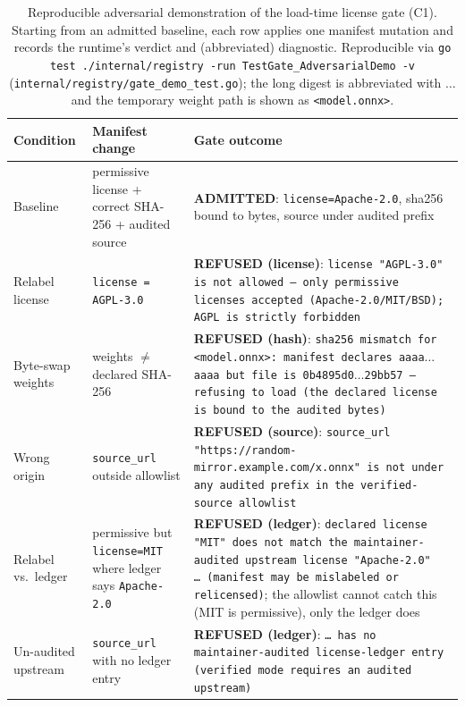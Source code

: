 \begin{table}[t]
  \centering
  \footnotesize
  \setlength{\tabcolsep}{3pt}
  \caption{%
    Reproducible adversarial demonstration of the load-time license gate (C1).
    Starting from an admitted baseline, each row applies one manifest mutation and
    records the runtime's verdict and (abbreviated) diagnostic.  Reproducible via
    \texttt{go test ./internal/registry -run TestGate\_AdversarialDemo -v}
    (\texttt{internal/registry/gate\_demo\_test.go}); the long digest is abbreviated
    with \(\dots\) and the temporary weight path is shown as \texttt{<model.onnx>}.%
  }
  \label{tab:gate}
  \begin{tabular}{p{1.2cm}p{1.5cm}p{5.4cm}}
    \toprule
    \textbf{Condition} & \textbf{Manifest change} & \textbf{Gate outcome} \\
    \midrule
    Baseline &
      permissive license \mbox{+} correct SHA-256 \mbox{+} audited source &
      \textbf{ADMITTED}: \texttt{license=Apache-2.0}, sha256 bound to bytes, source under
      audited prefix \\[4pt]

    Relabel license &
      \texttt{license = AGPL-3.0} &
      \textbf{REFUSED (license)}: \texttt{license "AGPL-3.0" is not allowed --- only
      permissive licenses accepted (Apache-2.0/MIT/BSD); AGPL is strictly forbidden} \\[4pt]

    Byte-swap weights &
      weights \(\neq\) declared SHA-256 &
      \textbf{REFUSED (hash)}: \texttt{sha256 mismatch for <model.onnx>: manifest declares
      aaaa\(\dots\)aaaa but file is 0b4895d0\(\dots\)29bb57 --- refusing to load (the
      declared license is bound to the audited bytes)} \\[4pt]

    Wrong origin &
      \texttt{source\_url} outside allowlist &
      \textbf{REFUSED (source)}: \texttt{source\_url
      "https://random-mirror.\allowbreak example.com/x.onnx" is not under any audited prefix in the
      verified-source allowlist} \\[4pt]

    Relabel vs.\ ledger &
      permissive but \texttt{license=MIT} where ledger says \texttt{Apache-2.0} &
      \textbf{REFUSED (ledger)}: \texttt{declared license "MIT" does not match the
      maintainer-audited upstream license "Apache-2.0" \dots\ (manifest may be mislabeled or
      relicensed)}; the allowlist cannot catch this (MIT is permissive), only the ledger does \\[4pt]

    Un-audited upstream &
      \texttt{source\_url} with no ledger entry &
      \textbf{REFUSED (ledger)}: \texttt{\dots\ has no maintainer-audited license-ledger entry
      (verified mode requires an audited upstream)} \\
    \bottomrule
  \end{tabular}
\end{table}

